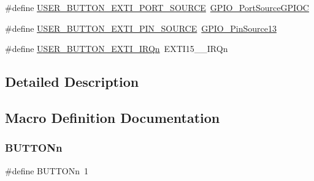 \begin{DoxyCompactItemize}
\item 
\#define \mbox{\hyperlink{group___s_t_m32_f1_x_x___n_u_c_l_e_o___l_o_w___l_e_v_e_l___b_u_t_t_o_n_gadb21b50e395cd0cbede08485aa46a7e1}{U\+S\+E\+R\+\_\+\+B\+U\+T\+T\+O\+N\+\_\+\+E\+X\+T\+I\+\_\+\+P\+O\+R\+T\+\_\+\+S\+O\+U\+R\+CE}}~\mbox{\hyperlink{group___g_p_i_o___port___sources_ga7511e96933d503ecf7128ebaff613e7e}{G\+P\+I\+O\+\_\+\+Port\+Source\+G\+P\+I\+OC}}
\item 
\#define \mbox{\hyperlink{group___s_t_m32_f1_x_x___n_u_c_l_e_o___l_o_w___l_e_v_e_l___b_u_t_t_o_n_ga228dea1ae32daacecea1c9344ba93cd3}{U\+S\+E\+R\+\_\+\+B\+U\+T\+T\+O\+N\+\_\+\+E\+X\+T\+I\+\_\+\+P\+I\+N\+\_\+\+S\+O\+U\+R\+CE}}~\mbox{\hyperlink{group___g_p_i_o___pin__sources_gace4beb385facd306324fa9e362df5fda}{G\+P\+I\+O\+\_\+\+Pin\+Source13}}
\item 
\#define \mbox{\hyperlink{group___s_t_m32_f1_x_x___n_u_c_l_e_o___l_o_w___l_e_v_e_l___b_u_t_t_o_n_ga2e6e65a053529869d1c370610825d98f}{U\+S\+E\+R\+\_\+\+B\+U\+T\+T\+O\+N\+\_\+\+E\+X\+T\+I\+\_\+\+I\+R\+Qn}}~E\+X\+T\+I15\+\_\+\_\+\+I\+R\+Qn
\end{DoxyCompactItemize}


\subsection{Detailed Description}


\subsection{Macro Definition Documentation}
\mbox{\label{group___s_t_m32_f1_x_x___n_u_c_l_e_o___l_o_w___l_e_v_e_l___b_u_t_t_o_n_ga43d47e509ada64329393005c3be15d64}} 
\subsubsection{\texorpdfstring{BUTTONn}{BUTTONn}}
{\footnotesize\ttfamily \#define B\+U\+T\+T\+O\+Nn~1}

\mbox{\label{group___s_t_m32_f1_x_x___n_u_c_l_e_o___l_o_w___l_e_v_e_l___b_u_t_t_o_n_ga2e6e65a053529869d1c370610825d98f}} 
